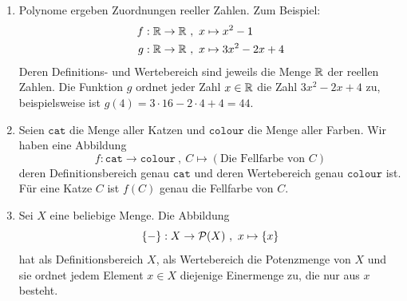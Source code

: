 \begin{bsp} \label{bsp:abbildung} \quad
    \begin{enumerate}
        \item Polynome ergeben Zuordnungen reeller Zahlen. Zum Beispiel:
        \begin{align*}
            f: \mathbb R \to \mathbb R \ & ,\ x  \mapsto x^2-1 \\
            g: \mathbb R \to \mathbb R \ & ,\  x  \mapsto 3x^2-2x+4
        \end{align*}
        Deren Definitions- und Wertebereich sind jeweils die Menge $\mathbb R$ der reellen Zahlen. Die Funktion $g$ ordnet jeder Zahl $x\in\mathbb R$ die Zahl $3x^2-2x+4$ zu, beispielsweise ist $g(4) = 3\cdot 16 - 2\cdot 4 + 4 = 44$.
        \item Seien $\mathtt{cat}$ die Menge aller Katzen und $\mathtt{colour}$ die Menge aller Farben. Wir haben eine Abbildung
            \[ f: \mathtt{cat} \to \mathtt{colour} \ ,\ C \mapsto (\text{Die Fellfarbe von $C$}) \]
        deren Definitionsbereich genau $\mathtt{cat}$ und deren Wertebereich genau $\mathtt{colour}$ ist. Für eine Katze $C$ ist $f(C)$ genau die Fellfarbe von $C$.
        \item Sei $X$ eine beliebige Menge. Die Abbildung
            \[ \{-\}: X \to \mathcal P(X) \ ,\ x \mapsto \{x\} \]
        hat als Definitionsbereich $X$, als Wertebereich die Potenzmenge von $X$ und sie ordnet jedem Element $x \in X$ diejenige Einermenge zu, die nur aus $x$ besteht.


\end{enumerate}
\end{bsp}
